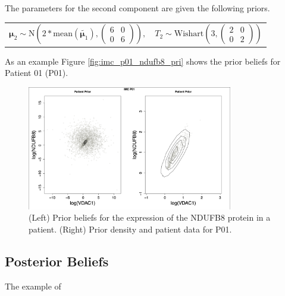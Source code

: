 \documentclass[a4paper, 12pt]{article}
\begin{document}
The parameters for the second component are given the following priors. 
\begin{center}
   \begin{tabular}{c  c}
    $\boldsymbol{\mu}_2 \sim \text{N}\left( 2*\text{mean}(\tilde{\boldsymbol{\mu}_1}), \begin{pmatrix}6&0\\0&6 \end{pmatrix}\right),$ & $T_2 \sim \text{Wishart}\left(3, \begin{pmatrix}2&0\\0&2\end{pmatrix} \right) $  \\
\end{tabular} 
\end{center}
As an example Figure \ref{fig:imc_p01_ndufb8_pri} shows the prior beliefs for Patient 01 (P01).

\begin{figure}[H]
    \centering
    \includegraphics[width=0.8\textwidth]{IMC_P01_NDUFB8_prior.png}
    \caption{(Left) Prior beliefs for the expression of the NDUFB8 protein in a patient. (Right) Prior density and patient data for P01.}
    \label{fig:imc_p01_ndufb8_prior}
\end{figure}

\subsection*{Posterior Beliefs}

The example of 
\end{document}

